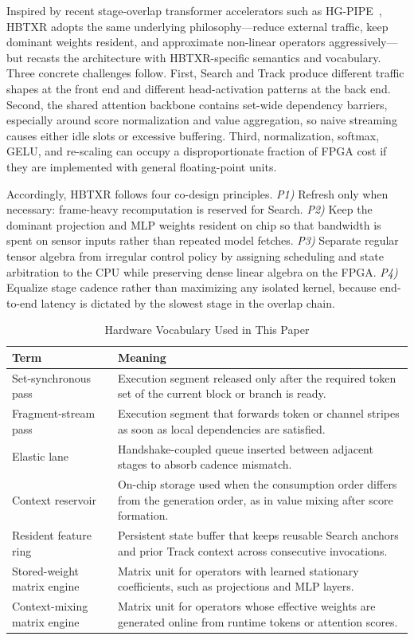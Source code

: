 \documentclass[journal]{IEEEtran}
\begin{document}
Inspired by recent stage-overlap transformer accelerators such as HG-PIPE~\cite{ref11}, HBTXR adopts the same underlying philosophy---reduce external traffic, keep dominant weights resident, and approximate non-linear operators aggressively---but recasts the architecture with HBTXR-specific semantics and vocabulary. Three concrete challenges follow. First, Search and Track produce different traffic shapes at the front end and different head-activation patterns at the back end. Second, the shared attention backbone contains set-wide dependency barriers, especially around score normalization and value aggregation, so naive streaming causes either idle slots or excessive buffering. Third, normalization, softmax, GELU, and re-scaling can occupy a disproportionate fraction of FPGA cost if they are implemented with general floating-point units.

Accordingly, HBTXR follows four co-design principles. \emph{P1)} Refresh only when necessary: frame-heavy recomputation is reserved for Search. \emph{P2)} Keep the dominant projection and MLP weights resident on chip so that bandwidth is spent on sensor inputs rather than repeated model fetches. \emph{P3)} Separate regular tensor algebra from irregular control policy by assigning scheduling and state arbitration to the CPU while preserving dense linear algebra on the FPGA. \emph{P4)} Equalize stage cadence rather than maximizing any isolated kernel, because end-to-end latency is dictated by the slowest stage in the overlap chain.

\begin{table}[t]
\caption{Hardware Vocabulary Used in This Paper}
\label{tab:vocab}
\centering
\scriptsize
\begin{tabular}{p{}p{}}
\toprule
Term & Meaning \\
\midrule
Set-synchronous pass & Execution segment released only after the required token set of the current block or branch is ready. \\
Fragment-stream pass & Execution segment that forwards token or channel stripes as soon as local dependencies are satisfied. \\
Elastic lane & Handshake-coupled queue inserted between adjacent stages to absorb cadence mismatch. \\
Context reservoir & On-chip storage used when the consumption order differs from the generation order, as in value mixing after score formation. \\
Resident feature ring & Persistent state buffer that keeps reusable Search anchors and prior Track context across consecutive invocations. \\
Stored-weight matrix engine & Matrix unit for operators with learned stationary coefficients, such as projections and MLP layers. \\
Context-mixing matrix engine & Matrix unit for operators whose effective weights are generated online from runtime tokens or attention scores. \\
\bottomrule
\end{tabular}
\end{table}
\end{document}
